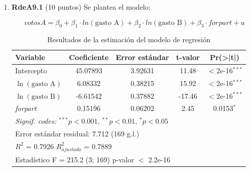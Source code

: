 \documentclass[10pt,a4paper]{article}
\begin{document}
\begin{enumerate}
\begin{center}
\vspace{0.5em}

$R^2 = 0.42$ \quad $F = 28.5$ (gl = 2, 92) \\[0.3em]
\textit{Nota:} *p $<$ 0.1; **p $<$ 0.05; ***p $<$ 0.01
\end{center}

 a) (5 puntos) 
Realice una prueba de significancia individual para el parámetro $\beta_{1}$ asociado a la variable \texttt{publicidad}, considerando un nivel de significancia del 10\%. Explique sus resultados.


b) (5 puntos) Un investigador sostiene que el efecto del precio sobre las ventas es mayor que cero
al 1\% de significancia. ¿Está usted de acuerdo? Justifique su respuesta utilizando los resultados del modelo.
 
 \item \textbf{RdeA9.1} (10 puntos)  Se plantea el modelo:

$$votosA = \beta_0 + \beta_1 \cdot ln(\text{gasto A}) + \beta_2 \cdot ln(\text{gasto B}) + \beta_3 \cdot forpart + u$$

\begin{table}[H]
\centering
\caption{Resultados de la estimación del modelo de regresión}
\label{tab:regresion}
\begin{tabular}{lcccc}
\toprule
\textbf{Variable} & \textbf{Coeficiente} & \textbf{Error estándar} & \textbf{t-valor} & \textbf{Pr(>|t|)} \\
\midrule
Intercepto & 45.07893 & 3.92631 & 11.48 & $<$2e-16$^{***}$ \\
$\ln(\text{gasto A})$ & 6.08332 & 0.38215 & 15.92 & $<$2e-16$^{***}$ \\
$\ln(\text{gasto B})$ & -6.61542 & 0.37882 & -17.46 & $<$2e-16$^{***}$ \\
\textit{forpart} & 0.15196 & 0.06202 & 2.45 & 0.0153$^{*}$ \\
\midrule
\multicolumn{5}{l}{\textit{Signif. codes:} $^{***}p<0.001$, $^{**}p<0.01$, $^{*}p<0.05$} \\
\midrule
\multicolumn{5}{l}{Error estándar residual: 7.712 (169 g.l.)} \\
\multicolumn{5}{l}{$R^2$ = 0.7926 \quad $R^2_{ajustado}$ = 0.7889} \\
\multicolumn{5}{l}{Estadístico F = 215.2 (3; 169) \quad p-valor $<$ 2.2e-16} \\
\bottomrule
\end{tabular}
\end{table}


\end{enumerate}
\end{document}
